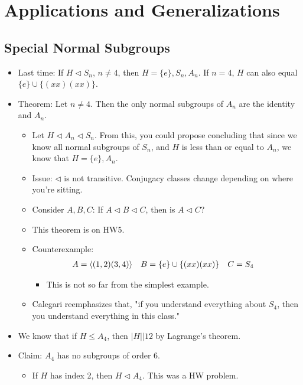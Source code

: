 \documentclass[../notes.tex]{subfiles}
\begin{document}
\chapter{Applications and Generalizations}
\section{Special Normal Subgroups}
\begin{itemize}
    \item {}Last time: If $H\triangleleft S_n$, $n\neq 4$, then $H=\{e\},S_n,A_n$. If $n=4$, $H$ can also equal $\{e\}\cup\{(xx)(xx)\}$.
    \item Theorem: Let $n\neq 4$. Then the only normal subgroups of $A_n$ are the identity and $A_n$.
    \begin{itemize}
        \item Let $H\triangleleft A_n\triangleleft S_n$. From this, you could propose concluding that since we know all normal subgroups of $S_n$, and $H$ is less than or equal to $A_n$, we know that $H=\{e\},A_n$.
        \item Issue: $\triangleleft$ is not transitive. Conjugacy classes change depending on where you're sitting.
        \item Consider $A,B,C$: If $A\triangleleft B\triangleleft C$, then is $A\triangleleft C$?
        \item This theorem is on HW5.
        \item Counterexample:
        \begin{align*}
            A &= \left\langle{(1,2)(3,4)}\right\rangle&
            B &= \{e\}\cup\{(xx)(xx)\}&
            C &= S_4
        \end{align*}
        \begin{itemize}
            \item This is not so far from the simplest example.
        \end{itemize}
        \item Calegari reemphasizes that, "if you understand everything about $S_4$, then you understand everything in this class."
    \end{itemize}
    \item We know that if $H\leq A_4$, then $|H|\big|12$ by Lagrange's theorem.
    \item Claim: $A_4$ has no subgroups of order 6.
    \begin{itemize}
        \item If $H$ has index 2, then $H\triangleleft A_4$. This was a HW problem.

\end{itemize}
\end{itemize}
\end{document}
